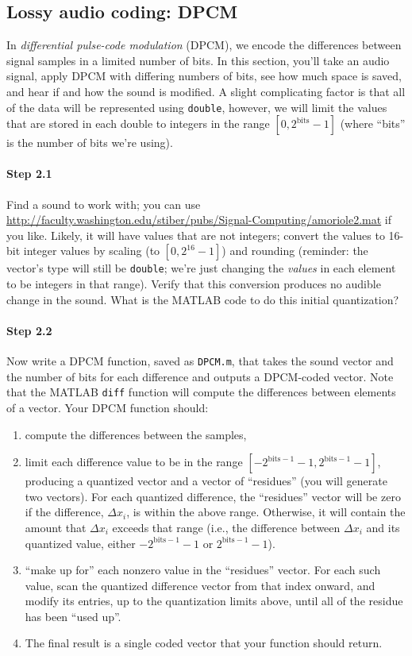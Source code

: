 \subsection{Lossy audio coding: DPCM}

In \emph{differential pulse-code modulation} (DPCM), we encode the
differences between signal samples in a limited number of bits. In
this section, you'll take an audio signal, apply DPCM with differing
numbers of bits, see how much space is saved, and hear if and how the
sound is modified. A slight complicating factor is that all of the
data will be represented using \texttt{double}, however, we will limit
the values that are stored in each double to integers in the range
$[0, 2^{\mathrm{bits}}-1]$ (where ``bits'' is the number of bits we're
using).

\paragraph{Step 2.1} Find a sound to work with; you can use
\url{http://faculty.washington.edu/stiber/pubs/Signal-Computing/amoriole2.mat}
if you like. Likely, it will have values that are not integers;
convert the values to 16-bit integer values by scaling (to $[0,
2^{16}-1]$) and rounding (reminder: the vector's type will still be
\texttt{double}; we're just changing the \emph{values} in each element
to be integers in that range). Verify that this conversion produces no
audible change in the sound. What is the MATLAB code to do this
initial quantization?

\paragraph{Step 2.2} Now write a DPCM function, saved as
\texttt{DPCM.m}, that takes the sound vector and the number of bits
for each difference and outputs a DPCM-coded vector. Note that the
MATLAB \texttt{diff} function will compute the differences between
elements of a vector. Your DPCM function should:
\begin{enumerate}
\item compute the differences between the samples,
\item limit each difference value to be in the range
  $[-2^{\mathrm{bits}-1}-1, 2^{\mathrm{bits}-1}-1]$, producing a
  quantized vector and a vector of ``residues'' (you will generate two
  vectors). For each quantized difference, the ``residues'' vector
  will be zero if the difference, $\Delta x_i$, is within the above
  range. Otherwise, it will contain the amount that $\Delta x_i$
  exceeds that range (i.e., the difference between $\Delta x_i$ and
  its quantized value, either $-2^{\mathrm{bits}-1}-1$ or
  $2^{\mathrm{bits}-1}-1$).
\item ``make up for'' each nonzero value in the ``residues''
  vector. For each such value, scan the quantized difference vector
  from that index onward, and modify its entries, up to the
  quantization limits above, until all of the residue has been ``used
  up''.
\item The final result is a single coded vector that your function
  should return.
\end{enumerate}

